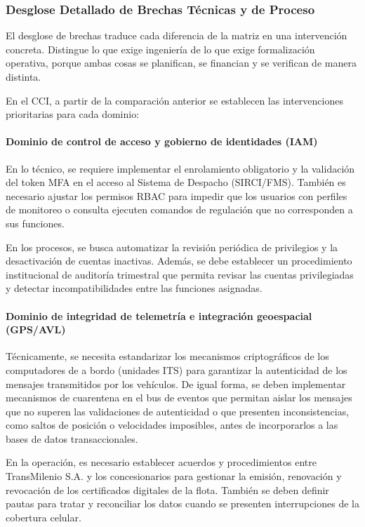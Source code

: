 \subsubsection{Desglose Detallado de Brechas Técnicas y de Proceso}
\label{sec:desglose-brechas}

El desglose de brechas traduce cada diferencia de la matriz en una intervención concreta. Distingue lo que exige ingeniería de lo que exige formalización operativa, porque ambas cosas se planifican, se financian y se verifican de manera distinta.

En el CCI, a partir de la comparación anterior se establecen las intervenciones prioritarias para cada dominio:

\paragraph{Dominio de control de acceso y gobierno de identidades (IAM)}%
En lo técnico, se requiere implementar el enrolamiento obligatorio y la validación del token MFA en el acceso al Sistema de Despacho (SIRCI/FMS). También es necesario ajustar los permisos RBAC para impedir que los usuarios con perfiles de monitoreo o consulta ejecuten comandos de regulación que no corresponden a sus funciones.

En los procesos, se busca automatizar la revisión periódica de privilegios y la desactivación de cuentas inactivas. Además, se debe establecer un procedimiento institucional de auditoría trimestral que permita revisar las cuentas privilegiadas y detectar incompatibilidades entre las funciones asignadas.

\paragraph{Dominio de integridad de telemetría e integración geoespacial (GPS/AVL)}%
Técnicamente, se necesita estandarizar los mecanismos criptográficos de los computadores de a bordo (unidades ITS) para garantizar la autenticidad de los mensajes transmitidos por los vehículos. De igual forma, se deben implementar mecanismos de cuarentena en el bus de eventos que permitan aislar los mensajes que no superen las validaciones de autenticidad o que presenten inconsistencias, como saltos de posición o velocidades imposibles, antes de incorporarlos a las bases de datos transaccionales.

En la operación, es necesario establecer acuerdos y procedimientos entre TransMilenio S.A. y los concesionarios para gestionar la emisión, renovación y revocación de los certificados digitales de la flota. También se deben definir pautas para tratar y reconciliar los datos cuando se presenten interrupciones de la cobertura celular.

